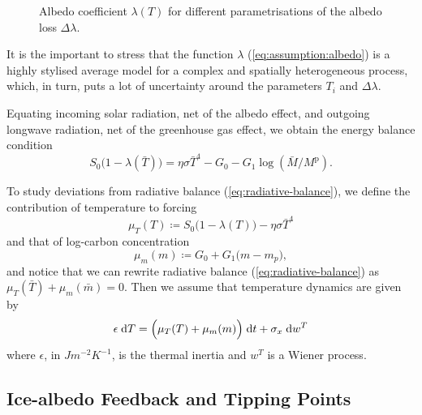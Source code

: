 \documentclass[../../main.tex]{subfiles}
\begin{document}
\begin{figure}[H]
    \centering
    \caption{Albedo coefficient $\lambda(T)$ for different parametrisations of the albedo loss $\Delta \lambda$.}
    \label{fig:albedo_coefficient}
\end{figure}

It is the important to stress that the function $\lambda$ (\ref{eq:assumption:albedo}) is a highly stylised average model for a complex and spatially heterogeneous process, which, in turn, puts a lot of uncertainty around the parameters $T_i$ and $\Delta \lambda$. \iffalse In the robustness checks we explore the sensitivity of our results to these parameters. \fi

Equating incoming solar radiation, net of the albedo effect, and outgoing longwave radiation, net of the greenhouse gas effect, we obtain the energy balance condition \begin{equation} \label{eq:radiative-balance}
    S_0 \big(1 - \lambda(\bar{T})\big) = \eta \sigma \bar{T}^4 - G_0 - G_1 \log(\bar{M} / M^{\mathrm{p}}).
\end{equation}

To study deviations from radiative balance (\ref{eq:radiative-balance}), we define the contribution of temperature to forcing \begin{equation} \label{eq:forcing:temperature}
    \mu_T(T) \coloneqq S_0 \big(1 - \lambda(T)\big) - \eta \sigma \bar{T}^4
\end{equation} and that of log-carbon concentration \begin{equation} \label{eq:forcing:concentration}
    \mu_m(m) \coloneqq  G_0 + G_1  \big(m - m_p \big),
\end{equation} and notice that we can rewrite radiative balance (\ref{eq:radiative-balance}) as $\mu_T(\bar{T}) + \mu_m(\bar{m}) = 0$. Then we assume that temperature dynamics are given by \begin{equation} \label{eq:dynamics:x}
    \epsilon \; \mathrm{d}T = \Big(\mu_T(T) + \mu_m(m)\Big) \; \mathrm{d}t + \sigma_x \; \mathrm{d}w^T
\end{equation} where $\epsilon$, in $\unit{J} \unit{m}^{-2} \unit{K}^{-1}$, is the thermal inertia and $w^T$ is a Wiener process.

\subsection{Ice-albedo Feedback and Tipping Points}
\end{document}
